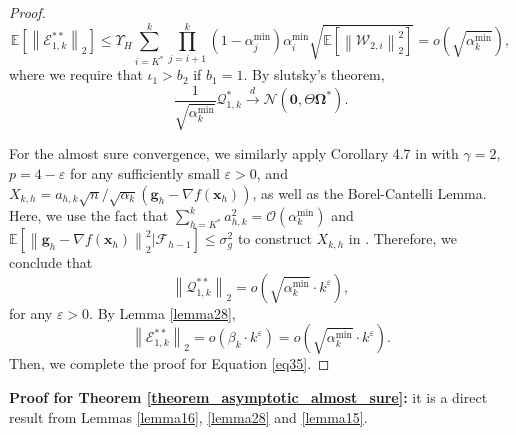 \documentclass[aos]{imsart}
\numberwithin{equation}{section}
\theoremstyle{plain}
\begin{document}
\begin{appendix}
\begin{proof}
    \begin{equation*}
        \mathbb{E} \left[ \left\| \mathcal{E}_{1,k}^{**} \right\|_2 \right] \leq \Upsilon_{H} \sum_{i=K^{*}}^{k} \prod_{j=i+1}^{k} (1-\alpha^{\min}_j) \alpha^{\min}_i  \sqrt{   \mathbb{E} \left[ \left\| \mathcal{W}_{2,i} \right\|_2^2 \right]} = o\left( \sqrt{\alpha^{\min}_k} \right),
    \end{equation*}
    where we require that $\iota_1 >b_2$ if $b_1 = 1$. By slutsky's theorem, 
    \begin{equation*}
        \frac{1}{\sqrt{\alpha^{\min}_k}} \mathcal{Q}_{1,k}^{*}  \stackrel{d}{\longrightarrow} \mathcal{N} \left( \bm{0}, \Theta \bm{\Omega}^{*} \right).
    \end{equation*}


    For the almost sure convergence, we similarly apply Corollary 4.7 in \cite{hao2014convergence} with $\gamma = 2$, $p = 4-\varepsilon$ for any sufficiently small $\varepsilon > 0$, and $X_{k,h} = a_{h,k} \sqrt{n} / \sqrt{\alpha_k} \left( \bm{g}_h - \nabla f(\bm{x}_{h}) \right)$, as well as the Borel-Cantelli Lemma. Here, we use the fact that $\sum_{h=K^{*}}^{k} a_{h,k}^2 = \mathcal{O}\left( \alpha^{\min}_k \right)$ and $\mathbb{E} \left[ \left\| \bm{g}_h - \nabla f(\bm{x}_{h})  \right\|_2^2 | \mathcal{F}_{h-1}  \right] \leq \sigma_{g}^2$ to construct $X_{k,h}$ in \cite{hao2014convergence}. Therefore, we conclude that 
    \begin{equation*}
        \left\| \mathcal{Q}_{1,k}^{**} \right\|_2 = o\left( \sqrt{\alpha^{\min}_k} \cdot k^{\varepsilon}  \right),
    \end{equation*}
    for any $\varepsilon > 0$. By Lemma \ref{lemma28}, 
    \begin{equation*}
        \left\| \mathcal{E}_{1,k}^{**} \right\|_2 = o\left( \beta_k \cdot k^{\varepsilon} \right) = o\left( \sqrt{\alpha^{\min}_k} \cdot k^{\varepsilon} \right).
    \end{equation*}
    Then, we complete the proof for Equation \eqref{eq35}.
    
    
    \end{proof}


\textbf{Proof for Theorem \ref{theorem_asymptotic_almost_sure}:}  it is a direct result from Lemmas \ref{lemma16}, \ref{lemma28} and \ref{lemma15}.


\end{appendix}
\end{document}
